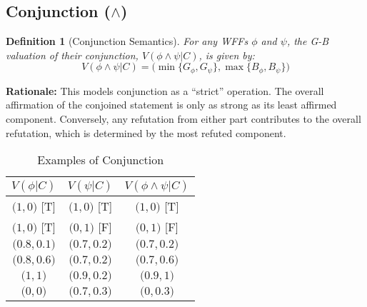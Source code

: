 \documentclass[11pt]{article}
\newcommand{\GB}[2]{\bigl(#1,#2\bigr)} %
\newtheorem{definition}{Definition}[section]
\theoremstyle{remark}
\begin{document}
\subsection{\texorpdfstring{Conjunction ($\land$)}{Conjunction}}
\begin{definition}[Conjunction Semantics] \label{def:conjunction_sem}
For any WFFs $\phi$ and $\psi$, the G-B valuation of their conjunction, $V(\phi \land \psi|C)$, is given by:
$$V(\phi \land \psi|C) = \GB{\min\{G_\phi, G_\psi\}}{\max\{B_\phi, B_\psi\}}$$
\end{definition}
\textbf{Rationale:} This models conjunction as a ``strict'' operation. The overall affirmation of the conjoined statement is only as strong as its least affirmed component. Conversely, any refutation from either part contributes to the overall refutation, which is determined by the most refuted component.
\begin{table}[H] \centering \caption{Examples of Conjunction}\label{tab:conjunction_examples}
\begin{tabular}{@{}ccc@{}} \toprule
\textbf{$V(\phi|C)$} & \textbf{$V(\psi|C)$} & \textbf{$V(\phi \land \psi|C)$} \\ \midrule
$\GB{1}{0}$ [T] & $\GB{1}{0}$ [T] & $\GB{1}{0}$ [T] \\
$\GB{1}{0}$ [T] & $\GB{0}{1}$ [F] & $\GB{0}{1}$ [F] \\
$\GB{0.8}{0.1}$ & $\GB{0.7}{0.2}$ & $\GB{0.7}{0.2}$ \\
$\GB{0.8}{0.6}$ & $\GB{0.7}{0.2}$ & $\GB{0.7}{0.6}$ \\ 
$\GB{1}{1}$ & $\GB{0.9}{0.2}$ & $\GB{0.9}{1}$ \\
$\GB{0}{0}$ & $\GB{0.7}{0.3}$ & $\GB{0}{0.3}$ \\ \bottomrule
\end{tabular} \end{table}
\end{document}
